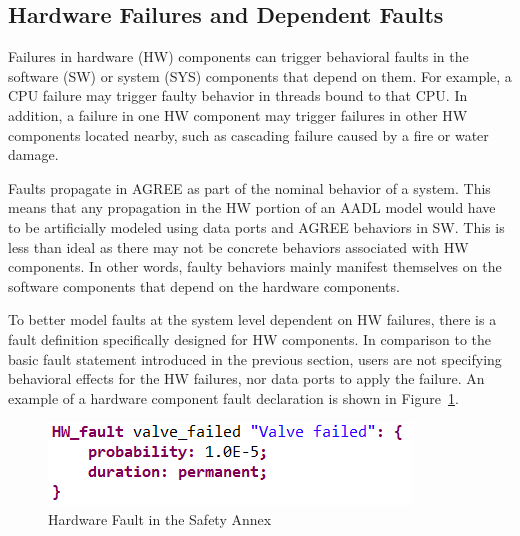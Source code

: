 \subsection{Hardware Failures and Dependent Faults}
\label{sec:hardware_faults}
Failures in hardware (HW) components can trigger behavioral faults in the software (SW) or system (SYS) components that depend on them.  For example, a CPU failure may trigger faulty behavior in threads bound to that CPU. In addition, a failure in one HW component may trigger failures in other HW components located nearby, such as cascading failure caused by a fire or water damage.

Faults propagate in AGREE as part of the nominal behavior of a system. This means that any propagation in the HW portion of an AADL model would have to be artificially modeled using data ports and AGREE behaviors in SW. This is less than ideal as there may not be concrete behaviors associated with HW components. In other words, faulty behaviors mainly manifest themselves on the software components that depend on the hardware components.

To better model faults at the system level dependent on HW failures, there is a fault definition specifically designed for HW components. In comparison to the basic fault statement introduced in the previous section, users are not specifying behavioral effects for the HW failures, nor data ports to apply the failure. An example of a hardware component fault declaration is shown in Figure~\ref{fig:hardware_fault}.

\begin{figure}[h!]
	\begin{center}
		\includegraphics[width=.4\textwidth]{images/hw_fault.png}
		\caption{Hardware Fault in the Safety Annex}
		\label{fig:hardware_fault}
	\end{center}
\end{figure}


